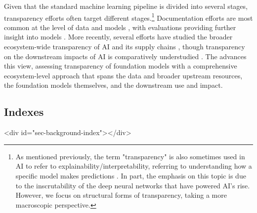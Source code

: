 \documentclass[screen, authorversion, acmsmall]{acmart}
\begin{document}
Given that the standard machine learning pipeline is divided into several stages, transparency efforts often target different stages.\footnote{As mentioned previously, the term "transparency" is also sometimes used in AI to refer to explainability/interpretability, referring to understanding how a specific model makes predictions \citep{zou2023representation}.
In part, the emphasis on this topic is due to the inscrutability of the deep neural networks that have powered AI's rise.
However, we focus on structural forms of transparency, taking a more macroscopic perspective.}
Documentation efforts are most common at the level of data \citep{gebru2021datasheets, bender2018data, pushkarna2022data} and models \citep{mitchell2018modelcards, crisan2022interactive}, with evaluations providing further insight into models \citep{deng2009imagenet, ribeiro2020beyond, perez2022red, liang2022helm, bommasani2023transparency}.
More recently, several efforts have studied the broader ecosystem-wide transparency of AI and its supply chains \citep{bommasani2023ecosystem, cen2023supplychain}, though transparency on the downstream impacts of AI is comparatively understudied \citep{narayanan2023transparencyreports}.
The \projectname advances this view, assessing transparency of foundation models with a comprehensive ecosystem-level approach that spans the data and broader upstream resources, the foundation models themselves, and the downstream use and impact.

\hypertarget{index}{\subsection{Indexes}}
<div id="sec-background-index"></div>
\end{document}
